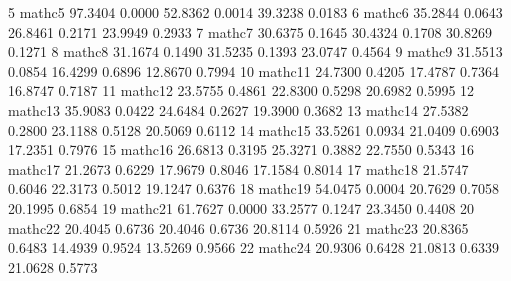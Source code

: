 \documentclass[
]{article}
\newenvironment{Shaded}{\begin{snugshade}}{\end{snugshade}}
\newcommand{\DecValTok}[1]{\textcolor[rgb]{0.00,0.00,0.81}{#1}}
\newcommand{\FloatTok}[1]{\textcolor[rgb]{0.00,0.00,0.81}{#1}}
\newcommand{\NormalTok}[1]{#1}
\begin{document}
\begin{Shaded}
\begin{Highlighting}[]
\DecValTok{5}\NormalTok{   mathc5  }\FloatTok{97.3404} \FloatTok{0.0000} \FloatTok{52.8362} \FloatTok{0.0014} \FloatTok{39.3238} \FloatTok{0.0183}
\DecValTok{6}\NormalTok{   mathc6  }\FloatTok{35.2844} \FloatTok{0.0643} \FloatTok{26.8461} \FloatTok{0.2171} \FloatTok{23.9949} \FloatTok{0.2933}
\DecValTok{7}\NormalTok{   mathc7  }\FloatTok{30.6375} \FloatTok{0.1645} \FloatTok{30.4324} \FloatTok{0.1708} \FloatTok{30.8269} \FloatTok{0.1271}
\DecValTok{8}\NormalTok{   mathc8  }\FloatTok{31.1674} \FloatTok{0.1490} \FloatTok{31.5235} \FloatTok{0.1393} \FloatTok{23.0747} \FloatTok{0.4564}
\DecValTok{9}\NormalTok{   mathc9  }\FloatTok{31.5513} \FloatTok{0.0854} \FloatTok{16.4299} \FloatTok{0.6896} \FloatTok{12.8670} \FloatTok{0.7994}
\DecValTok{10}\NormalTok{ mathc11  }\FloatTok{24.7300} \FloatTok{0.4205} \FloatTok{17.4787} \FloatTok{0.7364} \FloatTok{16.8747} \FloatTok{0.7187}
\DecValTok{11}\NormalTok{ mathc12  }\FloatTok{23.5755} \FloatTok{0.4861} \FloatTok{22.8300} \FloatTok{0.5298} \FloatTok{20.6982} \FloatTok{0.5995}
\DecValTok{12}\NormalTok{ mathc13  }\FloatTok{35.9083} \FloatTok{0.0422} \FloatTok{24.6484} \FloatTok{0.2627} \FloatTok{19.3900} \FloatTok{0.3682}
\DecValTok{13}\NormalTok{ mathc14  }\FloatTok{27.5382} \FloatTok{0.2800} \FloatTok{23.1188} \FloatTok{0.5128} \FloatTok{20.5069} \FloatTok{0.6112}
\DecValTok{14}\NormalTok{ mathc15  }\FloatTok{33.5261} \FloatTok{0.0934} \FloatTok{21.0409} \FloatTok{0.6903} \FloatTok{17.2351} \FloatTok{0.7976}
\DecValTok{15}\NormalTok{ mathc16  }\FloatTok{26.6813} \FloatTok{0.3195} \FloatTok{25.3271} \FloatTok{0.3882} \FloatTok{22.7550} \FloatTok{0.5343}
\DecValTok{16}\NormalTok{ mathc17  }\FloatTok{21.2673} \FloatTok{0.6229} \FloatTok{17.9679} \FloatTok{0.8046} \FloatTok{17.1584} \FloatTok{0.8014}
\DecValTok{17}\NormalTok{ mathc18  }\FloatTok{21.5747} \FloatTok{0.6046} \FloatTok{22.3173} \FloatTok{0.5012} \FloatTok{19.1247} \FloatTok{0.6376}
\DecValTok{18}\NormalTok{ mathc19  }\FloatTok{54.0475} \FloatTok{0.0004} \FloatTok{20.7629} \FloatTok{0.7058} \FloatTok{20.1995} \FloatTok{0.6854}
\DecValTok{19}\NormalTok{ mathc21  }\FloatTok{61.7627} \FloatTok{0.0000} \FloatTok{33.2577} \FloatTok{0.1247} \FloatTok{23.3450} \FloatTok{0.4408}
\DecValTok{20}\NormalTok{ mathc22  }\FloatTok{20.4045} \FloatTok{0.6736} \FloatTok{20.4046} \FloatTok{0.6736} \FloatTok{20.8114} \FloatTok{0.5926}
\DecValTok{21}\NormalTok{ mathc23  }\FloatTok{20.8365} \FloatTok{0.6483} \FloatTok{14.4939} \FloatTok{0.9524} \FloatTok{13.5269} \FloatTok{0.9566}
\DecValTok{22}\NormalTok{ mathc24  }\FloatTok{20.9306} \FloatTok{0.6428} \FloatTok{21.0813} \FloatTok{0.6339} \FloatTok{21.0628} \FloatTok{0.5773}

\end{Highlighting}
\end{Shaded}
\end{document}
